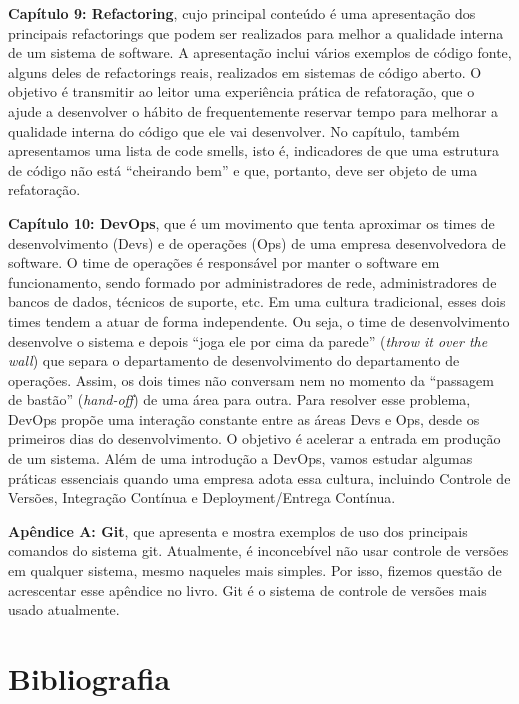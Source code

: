 \documentclass[
  11pt,
  twoside]{book}
\begin{document}
\textbf{Capítulo 9: Refactoring}, cujo principal conteúdo é uma
apresentação dos principais refactorings que podem ser realizados para
melhor a qualidade interna de um sistema de software. A apresentação
inclui vários exemplos de código fonte, alguns deles de refactorings
reais, realizados em sistemas de código aberto. O objetivo é transmitir
ao leitor uma experiência prática de refatoração, que o ajude a
desenvolver o hábito de frequentemente reservar tempo para melhorar a
qualidade interna do código que ele vai desenvolver. No capítulo, também
apresentamos uma lista de code smells, isto é, indicadores de que uma
estrutura de código não está ``cheirando bem'' e que, portanto, deve ser
objeto de uma refatoração.

\textbf{Capítulo 10: DevOps}, que é um movimento que tenta aproximar os
times de desenvolvimento (Devs) e de operações (Ops) de uma empresa
desenvolvedora de software. O time de operações é responsável por manter
o software em funcionamento, sendo formado por administradores de rede,
administradores de bancos de dados, técnicos de suporte, etc. Em uma
cultura tradicional, esses dois times tendem a atuar de forma
independente. Ou seja, o time de desenvolvimento desenvolve o sistema e
depois ``joga ele por cima da parede'' (\emph{throw it over the wall})
que separa o departamento de desenvolvimento do departamento de
operações. Assim, os dois times não conversam nem no momento da
``passagem de bastão'' (\emph{hand-off}) de uma área para outra. Para
resolver esse problema, DevOps propõe uma interação constante entre as
áreas Devs e Ops, desde os primeiros dias do desenvolvimento. O objetivo
é acelerar a entrada em produção de um sistema. Além de uma introdução a
DevOps, vamos estudar algumas práticas essenciais quando uma empresa
adota essa cultura, incluindo Controle de Versões, Integração Contínua e
Deployment/Entrega Contínua.

\textbf{Apêndice A: Git}, que apresenta e mostra exemplos de uso dos
principais comandos do sistema git. Atualmente, é inconcebível não usar
controle de versões em qualquer sistema, mesmo naqueles mais simples.
Por isso, fizemos questão de acrescentar esse apêndice no livro. Git é o
sistema de controle de versões mais usado atualmente.

\hypertarget{bibliografia}{%
\section*{Bibliografia}\label{bibliografia}}
\end{document}
